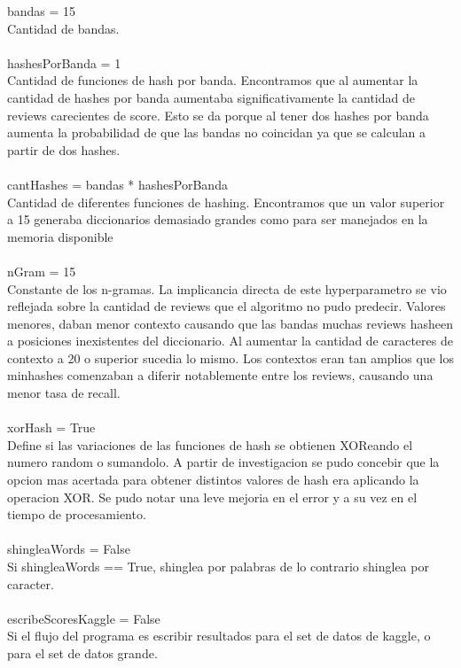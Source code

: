 \documentclass[a4paper,10pt]{article}
\begin{document}
	bandas = 15 \\
	Cantidad de bandas. \\ \\
	
	hashesPorBanda = 1 \\
	Cantidad de funciones de hash por banda. Encontramos que al aumentar la cantidad de hashes por banda aumentaba significativamente la cantidad de reviews carecientes de score. Esto se da porque al tener dos hashes por banda aumenta la probabilidad de que las bandas no coincidan ya que se calculan a partir de dos hashes. \\ \\ 

	cantHashes = bandas * hashesPorBanda \\
	Cantidad de diferentes funciones de hashing. Encontramos que un valor superior a 15 generaba diccionarios demasiado grandes como para ser manejados en la memoria disponible \\ \\

	nGram = 15 \\
	Constante de los n-gramas. La implicancia directa de este hyperparametro se vio reflejada sobre la cantidad de reviews que el algoritmo no pudo predecir. Valores menores, daban menor contexto causando que las bandas muchas reviews hasheen a posiciones inexistentes del diccionario. Al aumentar la cantidad de caracteres de contexto a 20 o superior sucedia lo mismo. Los contextos eran tan amplios que los minhashes comenzaban a diferir notablemente entre los reviews, causando una menor tasa de recall. \\ \\

	xorHash = True \\
	Define si las variaciones de las funciones de hash se obtienen XOReando el numero random o sumandolo. A partir de investigacion se pudo concebir que la opcion mas acertada para obtener distintos valores de hash era aplicando la operacion XOR. Se pudo notar una leve mejoria en el error y a su vez en el tiempo de procesamiento. \\ \\

	shingleaWords = False \\
	Si shingleaWords == True, shinglea por palabras de lo contrario shinglea por caracter. \\ \\


	escribeScoresKaggle = False \\
	Si el flujo del programa es escribir resultados para el set de datos de kaggle, o para el set de datos grande. \\ \\
\end{document}
